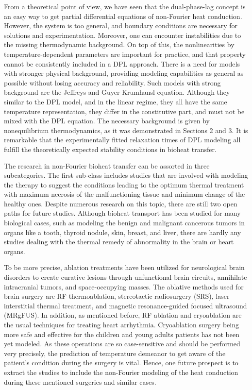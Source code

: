 \documentclass[sn-mathphys]{sn-jnl}%
\theoremstyle{thmstyleone}%
\theoremstyle{thmstyletwo}%
\theoremstyle{thmstylethree}%
\begin{document}
From a theoretical point of view, we have seen that the dual-phase-lag concept is an easy way to get partial differential equations of non-Fourier heat conduction. However, the system is too general, and boundary conditions are necessary for solutions and experimentation. Moreover, one can encounter instabilities due to the missing thermodynamic background. On top of this, the nonlinearities by temperature-dependent parameters are important for practice, and that property cannot be consistently included in a DPL approach. There is a need for models with stronger physical background, providing modeling capabilities as general as possible without losing accuracy and reliability. Such models with strong background are the Jeffreys and Guyer-Krumhansl equation. Although they similar to the DPL model, and in the linear regime, they all have the same temperature representation, they differ in the constitutive part, and must not be mixed with the DPL equation. The necessary background is given by nonequilibrium thermodynamics, as it was demonstrated in Sections 2 and 3. It is remarkable that the experimentally fitted relaxation times of DPL modeling all fulfill the theoretically expected stability conditions in bioheat transfer.

The research in non-Fourier bioheat transfer can be assorted in three subcategories. The first sub-class includes studies that are involved with modeling the therapy to suggest the conditions leading to the optimum thermal treatment with maximum necrosis of the malfunctioning tissue and minimum change of the healthy ones. Despite numerous research on this topic, there are still two open paths for future studies. Although bioheat transport has been studied for many biological cases, such as modeling the benign and malignant cancerous tumors in organs like a tooth, thyroid nodule, skin, breast, and liver, there are hardly any studies dealing with the thermal remedy of abnormality in the brain or heart organs.

To be more precise, ablation treatments have been utilized for neurological brain disorders to create curative lesions through unfunctional brain circuits, annihilate intracranial tumors, and space-occupying masses. The ablative methods used for brain surgery are RF thermoablation, stereotactic radiosurgery (SRS), laser interstitial thermal treatment, and magnetic resonance-guided focused ultrasound (MRgFUS). In addition, as mentioned before, RF ablation and cryoablation are the usual techniques for treating heart arrhythmia. Cryoablation surgery being more safe and effective for the children and young adults patients \cite{Hanninen2013} has not been yet modeled. As these operations are so case-sensitive and should be performed very precisely, the prediction of temperature demeanor to get aware of the patient's condition during the surgery is vital. Hence, one future prospect is to extract the studies to include the non-Fourier modeling of the heat conduction during these mentioned surgeries and similar cases.
\end{document}
